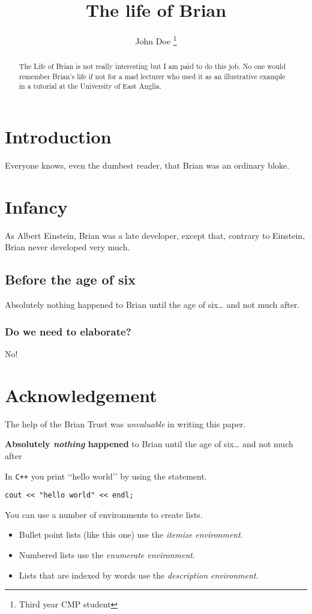 \documentclass[12pt]{scrartcl}
\title{The life of Brian}
\author{John Doe
\thanks{Third year CMP student}}
\begin{document}
\maketitle
\begin{abstract}
	The Life of Brian is not really interesting but I am
	paid to do this job. No one would remember Brian's
	life if not for a mad lecturer who used it as an
	illustrative example in a tutorial at the University
	of East Anglia.
\end{abstract}


\section{Introduction}
Everyone knows, even the dumbest reader, that Brian was
an ordinary bloke.
\section{Infancy}
As Albert Einstein, Brian was a late developer, except
that, contrary to Einstein, Brian never developed very
much.


\subsection{Before the age of six}
Absolutely nothing happened to Brian until the age of
six\ldots{} and not much after.
\subsubsection{Do we need to elaborate?}
No!
\section*{Acknowledgement}
The help of the Brian Trust was \emph{unvaluable} in writing
this paper.


\textbf{Absolutely \emph{nothing} happened} to Brian
until the age of six\ldots{} and not much after

In \texttt{C++} you print ‘‘hello world’’
by using the statement.
\begin{center}
	\texttt{cout << "hello world" << endl;}
\end{center}


You can use a number of environments to create
lists.
\begin{itemize}
	\item Bullet point lists (like this one)
	use the \emph{itemize environment}.
	\item Numbered lists use the
	\emph{enumerate environment}.
	\item Lists that are indexed by words use
	the \emph{description environment}.
\end{itemize}
\end{document}
